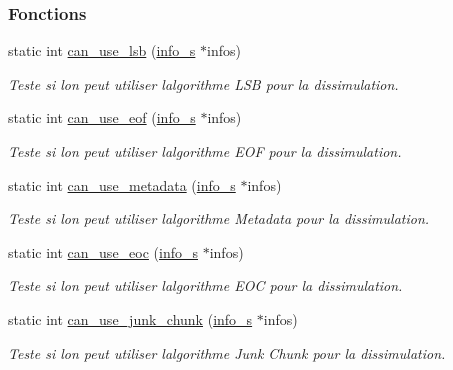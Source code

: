 \subsubsection*{Fonctions}
\begin{DoxyCompactItemize}
\item 
static int \hyperlink{a00128_adb74030cbeeeadb4f0872cd6cb067796}{can\+\_\+use\+\_\+lsb} (\hyperlink{a00008_aa8ca908d92fb5bdd3c0a9e1f58b2cf03}{info\+\_\+s} $\ast$infos)
\begin{DoxyCompactList}\small\item\em Teste si l\textquotesingle{}on peut utiliser l\textquotesingle{}algorithme L\+SB pour la dissimulation. \end{DoxyCompactList}\item 
static int \hyperlink{a00128_a28857a3fb0be2252aa54849431d1582f}{can\+\_\+use\+\_\+eof} (\hyperlink{a00008_aa8ca908d92fb5bdd3c0a9e1f58b2cf03}{info\+\_\+s} $\ast$infos)
\begin{DoxyCompactList}\small\item\em Teste si l\textquotesingle{}on peut utiliser l\textquotesingle{}algorithme E\+OF pour la dissimulation. \end{DoxyCompactList}\item 
static int \hyperlink{a00128_ac1012fe713837a597197f24dedc7314f}{can\+\_\+use\+\_\+metadata} (\hyperlink{a00008_aa8ca908d92fb5bdd3c0a9e1f58b2cf03}{info\+\_\+s} $\ast$infos)
\begin{DoxyCompactList}\small\item\em Teste si l\textquotesingle{}on peut utiliser l\textquotesingle{}algorithme Metadata pour la dissimulation. \end{DoxyCompactList}\item 
static int \hyperlink{a00128_a39a800f242ed5484ff790ee9e92070ab}{can\+\_\+use\+\_\+eoc} (\hyperlink{a00008_aa8ca908d92fb5bdd3c0a9e1f58b2cf03}{info\+\_\+s} $\ast$infos)
\begin{DoxyCompactList}\small\item\em Teste si l\textquotesingle{}on peut utiliser l\textquotesingle{}algorithme E\+OC pour la dissimulation. \end{DoxyCompactList}\item 
static int \hyperlink{a00128_a7003efd2a5625e2be5923b960397de06}{can\+\_\+use\+\_\+junk\+\_\+chunk} (\hyperlink{a00008_aa8ca908d92fb5bdd3c0a9e1f58b2cf03}{info\+\_\+s} $\ast$infos)
\begin{DoxyCompactList}\small\item\em Teste si l\textquotesingle{}on peut utiliser l\textquotesingle{}algorithme Junk Chunk pour la dissimulation. \end{DoxyCompactList}\item 

\end{DoxyCompactItemize}
